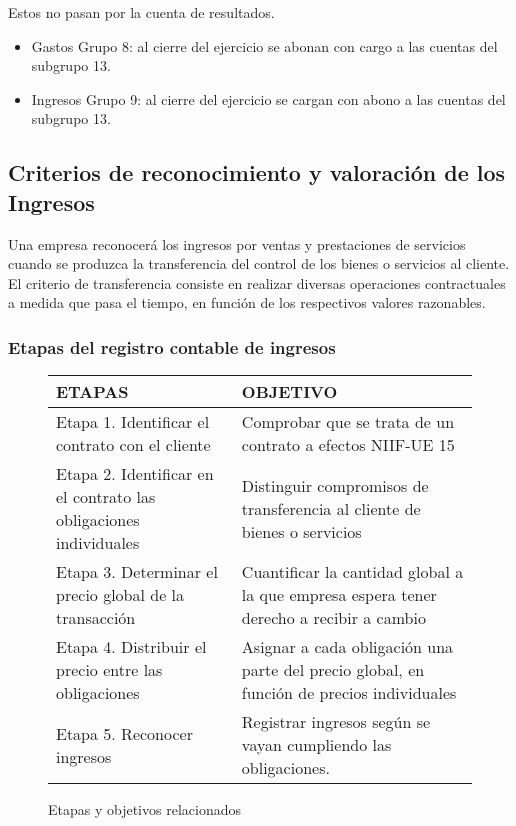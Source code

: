 \documentclass[a4paper,12pt]{article}
\begin{document}
Estos no pasan por la cuenta de resultados.
\begin{itemize}
    \item Gastos Grupo 8: al cierre del ejercicio se abonan con cargo a las cuentas del subgrupo 13.
    \item Ingresos Grupo 9: al cierre del ejercicio se cargan con abono a las cuentas del subgrupo 13.
\end{itemize}

\subsection{Criterios de reconocimiento y valoración de los Ingresos}

Una empresa reconocerá los ingresos por ventas y prestaciones de servicios cuando se produzca la transferencia del control de los bienes o servicios al cliente.\\
El criterio de transferencia consiste en realizar diversas operaciones contractuales a medida que pasa el tiempo, en función de los respectivos valores razonables.

\subsubsection{Etapas del registro contable de ingresos}

\begin{figure}[H]
    \centering
    \begin{tabular}{|p{6cm}|p{6cm}|}
    \hline
    \textbf{ETAPAS} & \textbf{OBJETIVO} \\ \hline
    Etapa 1. Identificar el contrato con el cliente & Comprobar que se trata de un contrato a efectos NIIF-UE 15 \\ \hline
    Etapa 2. Identificar en el contrato las obligaciones individuales & Distinguir compromisos de transferencia al cliente de bienes o servicios \\ \hline
    Etapa 3. Determinar el precio global de la transacción & Cuantificar la cantidad global a la que empresa espera tener derecho a recibir a cambio \\ \hline
    Etapa 4. Distribuir el precio entre las obligaciones & Asignar a cada obligación una parte del precio global, en función de precios individuales \\ \hline
    Etapa 5. Reconocer ingresos & Registrar ingresos según se vayan cumpliendo las obligaciones. \\ \hline
    \end{tabular}
    \caption{Etapas y objetivos relacionados}
\end{figure}
\end{document}
